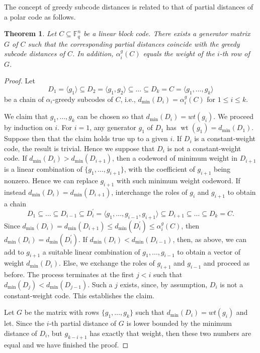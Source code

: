 \documentclass[12pt]{amsart}
\numberwithin{equation}{section}
\DeclareMathOperator{\wt}{wt}
\newtheorem{theorem}{Theorem}[section]
\theoremstyle{definition}
\newcommand{\FF}{\mathbb{F}}
\begin{document}
The concept of greedy subcode distances is related to that of partial distances of a polar code as follows. 

\begin{theorem}\label{thm:polar}
Let $C\subseteq\FF_q^n$ be a linear block code. There exists a generator matrix $G$ of $C$ such that the corresponding partial distances coincide with the greedy subcode distances of $C$. In addition, $\alpha_i^g(C)$ equals the weight of the $i$-th row of $G$.
\end{theorem}

\begin{proof}
Let $$D_1=\langle g_1\rangle\subseteq D_2=\langle g_{1},g_2\rangle\subseteq\ldots\subseteq D_k=C=\langle g_1,\ldots,g_k\rangle$$ be a chain of $\alpha_i$-greedy subcodes of $C$, i.e., $d_{\min}(D_i)=\alpha_i^g(C)$ for $1\leq i\leq k$.

We claim that $g_1,\ldots,g_k$ can be chosen so that $d_{\min}(D_i)=wt(g_i)$. We proceed by induction on $i$. For $i=1$, any generator $g_1$ of $D_1$ has $\wt(g_1)=d_{\min}(D_1)$. Suppose then that the claim holds true up to a given $i$. If $D_i$ is a constant-weight code, the result is trivial. Hence we suppose that $D_i$ is not a constant-weight code. If $d_{\min}(D_i)>d_{\min}(D_{i+1})$, then a codeword of minimum weight in $D_{i+1}$ is a linear combination of $\{g_1,\ldots,g_{i+1}\}$, with the coefficient of $g_{i+1}$ being nonzero. Hence we can replace $g_{i+1}$ with such minimum weight codeword. If instead $d_{\min}(D_i)=d_{\min}(D_{i+1})$, %
interchange the roles of $g_i$ and $g_{i+1}$ to obtain a chain 
$$D_1\subseteq\ldots\subseteq D_{i-1}\subseteq D_i^\prime=\langle g_1,\ldots,g_{i-1},g_{i+1}\rangle\subseteq D_{i+1}\subseteq\ldots\subseteq D_k=C.$$
Since $d_{\min}(D_{i})=d_{\min}(D_{i+1})\leq d_{\min}(D_i^\prime)\leq\alpha_i^g(C)$, then $d_{\min}(D_{i})=d_{\min}(D_{i}^\prime)$. If $d_{\min}(D_i)<d_{\min}(D_{i-1})$, then, as above, we can add to $g_{i+1}$ a suitable linear combination of $g_1,\ldots,g_{i-1}$ to obtain a vector of weight $d_{\min}(D_i)$. Else, we exchange the roles of $g_{i+1}$ and $g_{i-1}$ and proceed as before. The process terminates at the first $j<i$ such that $d_{\min}(D_j)<d_{\min}(D_{j-1})$. Such a $j$ exists, since, by assumption, $D_i$ is not a constant-weight code. This establishes the claim.

Let $G$ be the matrix with rows $\{g_1,\ldots,g_k\}$ such that $d_{\min}(D_i)=wt(g_i)$ and let. Since the $i$-th partial distance of $G$ is lower bounded by the minimum distance of $D_i$, but $g_{k-i+1}$ has exactly that weight, then these two numbers are equal and we have finished the proof.
\end{proof}
\end{document}
